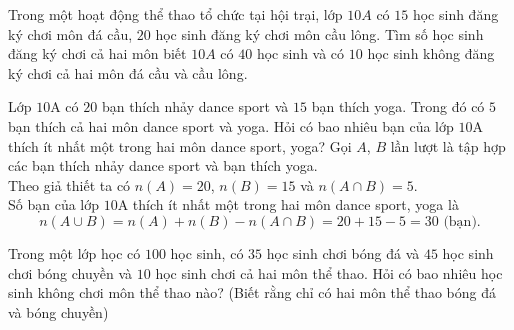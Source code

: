 \begin{bt}%
	Trong một hoạt động thể thao tổ chức tại hội trại, lớp $10A$ có $15$ học sinh đăng ký chơi môn đá cầu, $20$ học sinh đăng ký chơi môn cầu lông. Tìm số học sinh đăng ký chơi cả hai môn biết $10A$ có $40$ học sinh và có $10$ học sinh không đăng ký chơi cả hai môn đá cầu và cầu lông.
\end{bt}

\begin{bt}%
	Lớp $10$A có $20$ bạn thích nhảy dance sport và $15$ bạn thích yoga. Trong đó có $5$ bạn thích cả hai môn dance sport và yoga. Hỏi có bao nhiêu bạn của lớp $10$A thích ít nhất một trong hai môn dance sport, yoga?
	\loigiai
	{Gọi $A$, $B$ lần lượt là tập hợp các bạn thích nhảy dance sport và bạn thích yoga.\\
	Theo giả thiết ta có $n(A)=20$, $n(B)=15$ và $n(A\cap B)=5$.\\
		Số bạn của lớp $10$A thích ít nhất một trong hai môn dance sport, yoga là
		 \[ n(A\cup B)=n(A)+n(B)- n(A\cap B)=20+15-5=30\text{ (bạn)}.\]
	}
\end{bt}

\begin{bt}%
	Trong một lớp học có $100$ học sinh, có $35$ học sinh chơi bóng đá và $45$ học sinh chơi bóng chuyền và $10$ học sinh chơi cả hai môn thể thao. Hỏi có bao nhiêu học sinh không chơi môn thể thao nào? (Biết rằng chỉ có hai môn thể thao bóng đá và bóng chuyền)
\end{bt}

